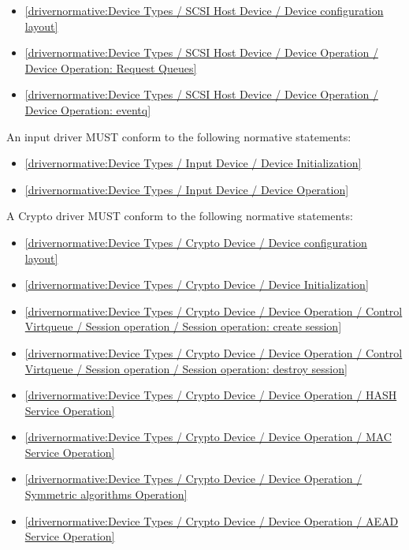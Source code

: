 \begin{itemize}
\item \ref{drivernormative:Device Types / SCSI Host Device / Device configuration layout}
\item \ref{drivernormative:Device Types / SCSI Host Device / Device Operation / Device Operation: Request Queues}
\item \ref{drivernormative:Device Types / SCSI Host Device / Device Operation / Device Operation: eventq}
\end{itemize}

\label{sec:Conformance / Driver Conformance / Input Driver Conformance}

An input driver MUST conform to the following normative statements:

\begin{itemize}
\item \ref{drivernormative:Device Types / Input Device / Device Initialization}
\item \ref{drivernormative:Device Types / Input Device / Device Operation}
\end{itemize}

\label{sec:Conformance / Driver Conformance / Crypto Driver Conformance}

A Crypto driver MUST conform to the following normative statements:

\begin{itemize}
\item \ref{drivernormative:Device Types / Crypto Device / Device configuration layout}
\item \ref{drivernormative:Device Types / Crypto Device / Device Initialization}
\item \ref{drivernormative:Device Types / Crypto Device / Device Operation / Control Virtqueue / Session operation / Session operation: create session}
\item \ref{drivernormative:Device Types / Crypto Device / Device Operation / Control Virtqueue / Session operation / Session operation: destroy session}
\item \ref{drivernormative:Device Types / Crypto Device / Device Operation / HASH Service Operation}
\item \ref{drivernormative:Device Types / Crypto Device / Device Operation / MAC Service Operation}
\item \ref{drivernormative:Device Types / Crypto Device / Device Operation / Symmetric algorithms Operation}
\item \ref{drivernormative:Device Types / Crypto Device / Device Operation / AEAD Service Operation}
\end{itemize}

